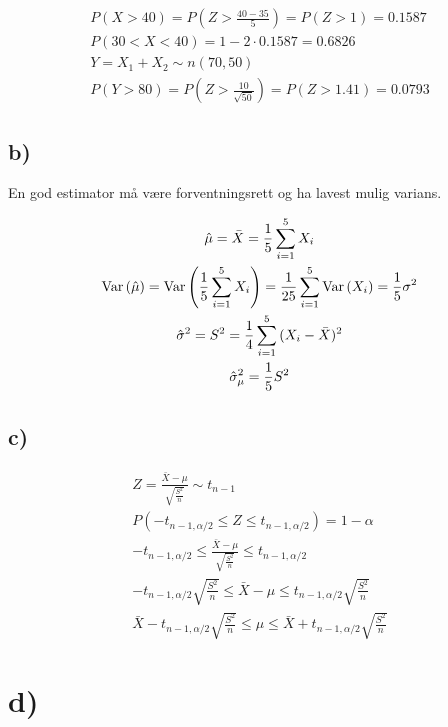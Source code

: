 \begin{gather*}
	P(X > 40) = P\left(Z > \frac{40 - 35}{5}\right) = P(Z > 1) = 0.1587
	\\
	P(30 < X < 40) = 1 - 2 \cdot 0.1587 = 0.6826
	\\
	Y = X_1 + X_2 \sim n(70, 50)
	\\
	P(Y > 80) = P\left(Z > \frac{10}{\sqrt{50}}\right) = P(Z > 1.41) = 0.0793
\end{gather*}


\subsection*{b)}

En god estimator må være forventningsrett og ha lavest mulig varians.

\begin{gather*}
	\hat \mu = \bar X = \frac{1}{5} \sum_{i = 1}^5{X_i}
	\\
	\text{Var}\left(\hat \mu\right) = \text{Var}\left(\frac{1}{5} \sum_{i = 1}^5{X_i}\right) = \frac{1}{25} \sum_{i = 1}^5{\text{Var}\left(X_i\right)} = \frac{1}{5} \sigma^2
	\\
	\hat \sigma^2 = S^2 = \frac{1}{4} \sum_{i = 1}^5{(X_i - \bar X)^2}
	\\
	\hat \sigma_\mu^2 = \frac{1}{5} S^2
\end{gather*}


\subsection*{c)}

\begin{gather*}	
	Z = \frac{\bar X - \mu}{\sqrt{\frac{S^2}{n}}} \sim t_{n - 1}
	\\
	P(-t_{n - 1, \alpha / 2} \leq Z \leq t_{n - 1, \alpha / 2}) = 1 - \alpha
	\\
	-t_{n - 1, \alpha / 2} \leq \frac{\bar X - \mu}{\sqrt{\frac{S^2}{n}}} \leq t_{n - 1, \alpha / 2}
	\\
	-t_{n - 1, \alpha / 2} \sqrt{\frac{S^2}{n}} \leq \bar X - \mu \leq t_{n - 1, \alpha / 2} \sqrt{\frac{S^2}{n}}
	\\
	\bar X - t_{n - 1, \alpha / 2} \sqrt{\frac{S^2}{n}} \leq \mu \leq \bar X + t_{n - 1, \alpha / 2} \sqrt{\frac{S^2}{n}}
\end{gather*}


\section*{d)}

